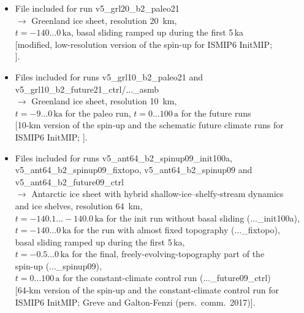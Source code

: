 \documentclass[12pt,a4paper]{article}
\begin{document}
\begin{itemize}
\begin{itemize}
\item
File included for run v5\_grl20\_b2\_paleo21
\\
$\longrightarrow$ Greenland ice sheet, resolution 20~km,
\\
\phantom{$\longrightarrow$} $t=-140\ldots{}0\,\mathrm{ka}$, basal sliding ramped up during the first 5\,ka
\\
\phantom{$\longrightarrow$} [modified, low-resolution version of the spin-up for ISMIP6 InitMIP; 
\\
\phantom{$\longrightarrow$} \citet{greve_etal_2017a}].

\item
Files included for runs v5\_grl10\_b2\_paleo21 and
\\{}
\hspace*{10.15em}v5\_grl10\_b2\_future21\_ctrl/...\_asmb
\\
$\longrightarrow$ Greenland ice sheet, resolution 10~km,
\\
\phantom{$\longrightarrow$} $t=-9\ldots{}0\,\mathrm{ka}$ for the paleo run, $t=0\ldots{}100\,\mathrm{a}$ for the future runs
\\{}
\phantom{$\longrightarrow$} [10-km version of the spin-up and the schematic future climate runs for 
\\
\phantom{$\longrightarrow$} ISMIP6 InitMIP; \citet{greve_etal_2017a}].

\item
Files included for runs v5\_ant64\_b2\_spinup09\_init100a,
\\
\hspace*{6.40em}v5\_ant64\_b2\_spinup09\_fixtopo, v5\_ant64\_b2\_spinup09 and
\\
\hspace*{6.40em}v5\_ant64\_b2\_future09\_ctrl
\\
$\longrightarrow$ Antarctic ice sheet with hybrid shallow-ice--shelfy-stream dynamics
\\
\phantom{$\longrightarrow$} \citep{bernales_etal_2017} and ice shelves, resolution 64~km,
\\
\phantom{$\longrightarrow$} $t=-140.1\ldots{}-140.0\,\mathrm{ka}$ for the init run without basal sliding (...\_init100a),
\\
\phantom{$\longrightarrow$} $t=-140\ldots{}0\,\mathrm{ka}$ for the run with almost fixed topography (...\_fixtopo),
\\
\hspace*{9.15em} basal sliding ramped up during the first 5\,ka,
\\
\phantom{$\longrightarrow$} $t=-0.5\ldots{}0\,\mathrm{ka}$ for the final, freely-evolving-topography part of the
\\
\hspace*{9.0em} spin-up (...\_spinup09),
\\
\phantom{$\longrightarrow$} $t=0\ldots{}100\,\mathrm{a}$ for the constant-climate control run (...\_future09\_ctrl)
\\{}
\phantom{$\longrightarrow$} [64-km version of the spin-up and the constant-climate control run for 
\\
\phantom{$\longrightarrow$} ISMIP6 InitMIP; Greve and Galton-Fenzi (pers.\ comm.\ 2017)].


\end{itemize}
\end{itemize}
\end{document}
